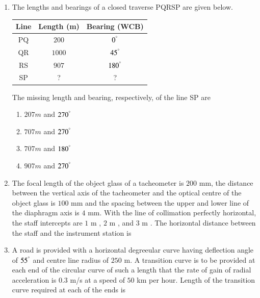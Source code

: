 \documentclass[journal]{IEEEtran}
\begin{document}
\begin{enumerate}
\item The lengths and bearings of a closed traverse PQRSP are given below.



\begin{tabular}{|c|c|c|}
\hline
Line & Length (m) & Bearing (WCB) \\
\hline
PQ & $200$ & $0^\degree$ \\
QR & $1000$ & $45^\degree$ \\
RS & $907$ & $180^\degree$ \\
SP & ? & ? \\
\hline
\end{tabular}



The missing length and bearing, respectively, of the line SP are \hfill {}

\begin{enumerate}
\item $207 m$ and $270^\degree$
\item $707 m$ and $270^\degree$
\item $707 m$ and $180^\degree$
\item $907 m$ and $270^\degree$
\end{enumerate}

\item The focal length of the object glass of a tacheometer is $200$ mm, the distance between the vertical axis of the tacheometer and the optical centre of the object glass is $100$ mm and the spacing between the upper and lower line of the diaphragm axis is $4$ mm. With the line of collimation perfectly horizontal, the staff intercepts are $1$ m , $2$ m , and $3$ m . The horizontal distance  between the staff and the instrument station is \hfill {}
\begin{enumerate}
\end{enumerate}

\item A road is provided with a horizontal degreeular curve having deflection angle of $55^\degree$ and centre line radius of $250$ m. A transition curve is to be provided at each end of the circular curve of such a length that the rate of gain of radial acceleration is $0.3$ m/s at a speed of $50$ km per hour. Length of the transition curve required at each of the ends is \hfill {}
\begin{enumerate}
\end{enumerate}


\end{enumerate}
\end{document}
